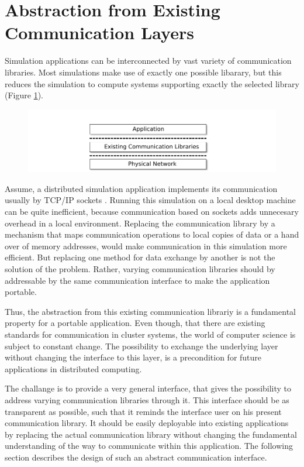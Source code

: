 \section{Abstraction from Existing Communication Layers}
\label{sec:comm_abstraction}

Simulation applications can be interconnected by vast variety of
communication libraries. Most simulations make use of exactly one
possible libarary, but this reduces the simulation to compute systems
supporting exactly the selected library (Figure \ref{fig:design_state_of_the_art}).

\begin{figure}[H]
  \centering \includegraphics[width=\textwidth]{graphics/30_design_state_of_the_art}
  \caption{}
  \label{fig:design_state_of_the_art}
\end{figure}


Assume, a distributed simulation application implements its
communication usually by TCP/IP sockets . Running this simulation on a
local desktop machine can be quite inefficient, because communication
based on sockets adds unnecesary overhead in a local
environment. Replacing the communication library by a mechanism that
maps communication operations to local copies of data or a hand over
of memory addresses, would make communication in this simulation more
efficient. But replacing one method for data exchange by another is
not the solution of the problem. Rather, varying communication
libraries should by addressable by the same communication interface to
make the application portable.

Thus, the abstraction from this existing communication librariy is a
fundamental property for a portable application.  Even though, that
there are existing standards for communication in cluster systems, the
world of computer science is subject to constant change. The
possibility to exchange the underlying layer without changing the
interface to this layer, is a precondition for future applications in
distributed computing.

The challange is to provide a very general interface, that gives the
possibility to address varying communication libraries through it.
This interface should be as transparent as possible, such that it
reminds the interface user on his present communication library.  It
should be easily deployable into existing applications by replacing
the actual communication library without changing the fundamental
understanding of the way to communicate within this application. The
following section describes the design of such an abstract
communication interface.


